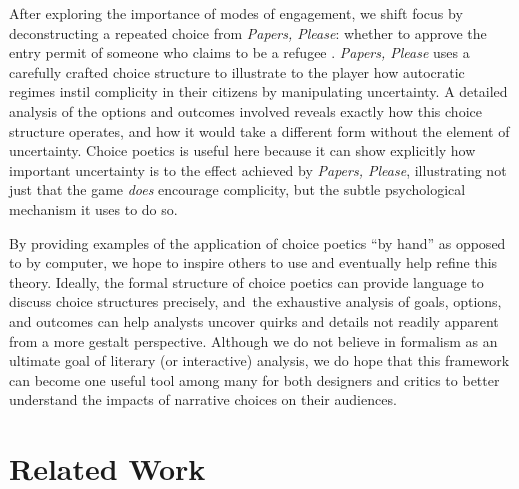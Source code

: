 \documentclass[arts,article,accept,moreauthors,pdftex,10pt,a4paper]{Definitions/mdpi}
\begin{document}
After exploring the importance of modes of engagement, we shift focus by deconstructing a repeated choice from \emph{Papers, Please}: whether  to approve the entry permit of someone who claims to be a refugee \citep{pope2013papers}.
%
\emph{Papers, Please} uses a carefully crafted choice structure to illustrate to the player how autocratic regimes instil complicity in their citizens by manipulating uncertainty.
%
A detailed analysis of the options and outcomes involved reveals exactly how this choice structure operates, and how it would take a different form without the element of uncertainty.
%
Choice poetics is useful here because it can show explicitly how important uncertainty is to the effect achieved by \emph{Papers, Please}, illustrating not just that the game \emph{does} encourage complicity, but the subtle psychological mechanism it uses to do so.


By providing examples of the application of choice poetics ``by hand'' as opposed to by computer, we hope to inspire others to use and eventually help refine this theory.
%
Ideally, the formal structure of choice poetics can provide language to discuss choice structures precisely, and~the exhaustive analysis of goals, options, and outcomes can help analysts uncover quirks and details not readily apparent from a more gestalt perspective.
%
Although we do not believe in formalism as an ultimate goal of literary (or interactive) analysis, we do hope that this framework can become one useful tool among many for both designers and critics to better understand the impacts of narrative choices on their audiences.

\section{Related Work}
\end{document}
